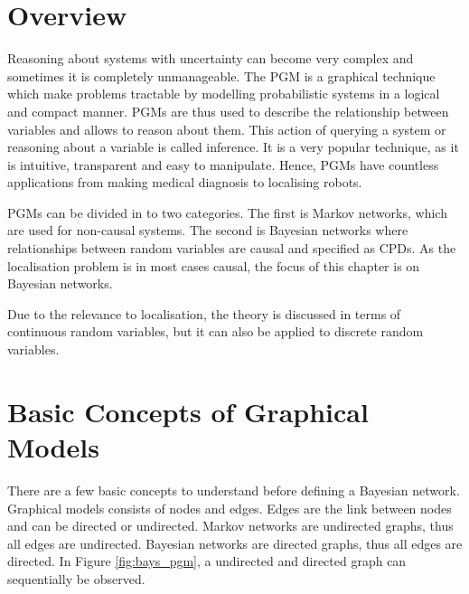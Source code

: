 \documentclass[12pt,oneside,openany,a4paper, %
afrikaans,english,
]{memoir}
\numberwithin{equation}{chapter}
\begin{document}
\section{Overview}
Reasoning about systems with uncertainty can become very complex and sometimes it is completely unmanageable. The PGM is a graphical technique which make problems tractable by modelling probabilistic systems in a logical and compact manner. PGMs are thus used to describe the relationship between variables and allows to reason about them. This action of querying a system or reasoning about a variable is called inference. It is a very popular technique, as it is intuitive, transparent and easy to manipulate. Hence, PGMs have countless applications from making medical diagnosis to localising robots.

PGMs can be divided in to two categories. The first is Markov networks, which are used for non-causal systems. The second is Bayesian networks where relationships between random variables are causal and specified as CPDs. As the localisation problem is in most cases causal, the focus of this chapter is on Bayesian networks.

Due to the relevance to localisation, the theory is discussed in terms of continuous random variables, but it can also be applied to discrete random variables. 
\section{Basic Concepts of Graphical Models}
There are a few basic concepts to understand before defining a Bayesian network. Graphical models consists of nodes and edges. Edges are the link between nodes and can be directed or undirected. Markov networks are undirected graphs, thus all edges are undirected. Bayesian networks are directed graphs, thus all edges are directed. In Figure \ref{fig:bays_pgm}, a undirected and directed graph can sequentially be observed.
\end{document}
